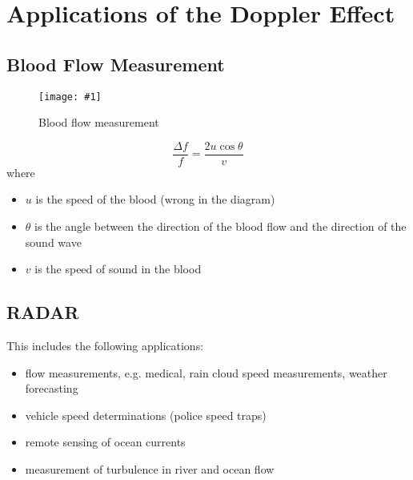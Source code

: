 \documentclass[a4paper,12pt]{article}
\let\oldsection\section
\renewcommand\section{\clearpage\oldsection}
\newcommand{\img}[4]{\begin{center}
  \begin{figure}[H]
    \centering
    \texttt{[image: \#1]}
    \caption{#3}
    \label{fig:#4}
  \end{figure}
\end{center}}
\begin{document}
\section{Applications of the Doppler Effect}

\subsection{Blood Flow Measurement}

\img{bloodvessel.png}{0.5}{Blood flow measurement}{bloodvessel}

\begin{equation}
  \frac{\Delta f}{f} = \frac{2u\cos\theta}{v}
\end{equation}
where
\begin{itemize}
  \item $u$ is the speed of the blood (wrong in the diagram)
  \item $\theta$ is the angle between the direction of the blood flow and the direction of the sound wave
  \item $v$ is the speed of sound in the blood
\end{itemize}

\pagebreak

\subsection{RADAR}

This includes the following applications:
\begin{itemize}
  \item flow measurements, e.g. medical, rain cloud speed measurements, weather forecasting
  \item vehicle speed determinations (police speed traps)
  \item remote sensing of ocean currents
  \item measurement of turbulence in river and ocean flow
\end{itemize}
\end{document}
